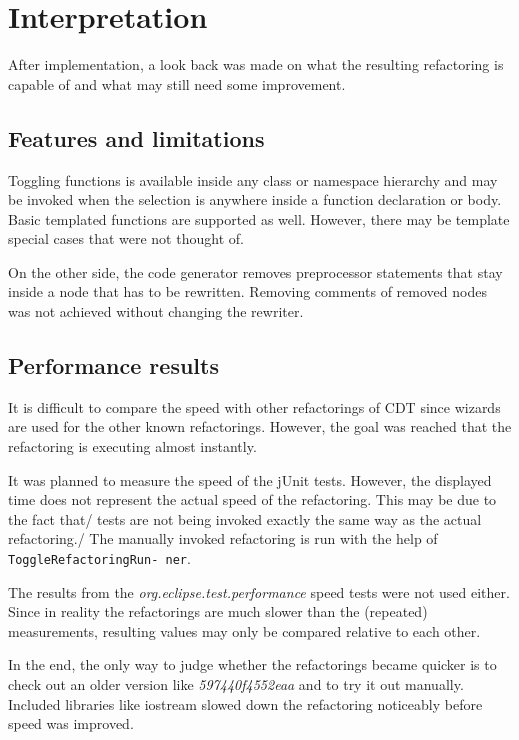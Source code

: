 \chapter{Interpretation}
\thispagestyle{fancy}

After implementation, a look back was made on what the resulting refactoring is 
capable of and what may still need some improvement.

\section{Features and limitations}

Toggling functions is available inside any class or namespace hierarchy and may 
be invoked when the selection is anywhere inside a function declaration or body. 
Basic templated functions are supported as well. However, there may be 
template special cases that were not thought of.

On the other side, the code generator removes preprocessor statements that stay 
inside a node that has to be rewritten. Removing comments of removed nodes was 
not achieved without changing the rewriter.

\section{Performance results}

It is difficult to compare the speed with other refactorings of CDT since wizards 
are used for the other known refactorings. However, the goal was reached that 
the refactoring is executing almost instantly.

It was planned to measure the speed of the jUnit tests. However, the displayed 
time does not represent the actual speed of the refactoring. This may be due to 
the fact that/ tests are not being invoked exactly the same way as the actual 
refactoring./ The manually invoked refactoring is run with the help of
\texttt{ToggleRefactoringRun- ner}.

The results from the \textit{org.eclipse.test.performance} speed tests were not 
used either. Since in reality the refactorings are much slower than the 
(repeated) measurements, resulting values may only be compared relative to each 
other.

In the end, the only way to judge whether the refactorings became quicker is to 
check out an older version like \textit{597440f4552eaa} and to try it out 
manually. Included libraries like iostream slowed down the refactoring 
noticeably before speed was improved.

